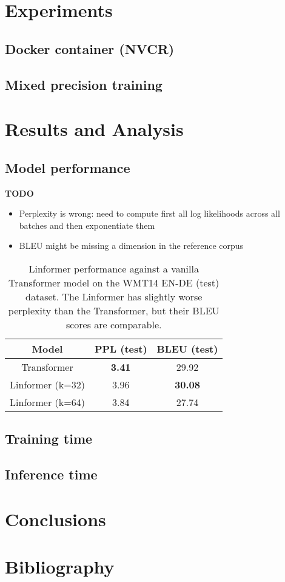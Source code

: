 \documentclass[titlepage]{article}
\begin{document}
\section{Experiments}
\subsection{Docker container (NVCR)}
\subsection{Mixed precision training}

\section{Results and Analysis}

\subsection{Model performance}

\textbf{TODO}
\begin{itemize}
  \item Perplexity is wrong: need to compute first all log likelihoods across
    all batches and then exponentiate them
  \item BLEU might be missing a dimension in the reference corpus
\end{itemize}

\begin{table}
  \begin{center}
    \begin{tabular}{c c c}
      \toprule
      Model                 & PPL (test) & BLEU (test)  \\
      \midrule
      Transformer       & \textbf{3.41} & 29.92 \\
      Linformer (k=32)  & 3.96          & \textbf{30.08}           \\
      Linformer (k=64)  & 3.84          & 27.74           \\
      \bottomrule
    \end{tabular}
  \end{center}
  \caption{Linformer performance against a vanilla Transformer model on the
  WMT14 EN-DE (test) dataset. The Linformer has slightly worse perplexity than
the Transformer, but their BLEU scores are comparable.}
  \label{tab:performance}
\end{table}
\subsection{Training time}\label{sec:training}

\subsection{Inference time}\label{sec:inference}

\section{Conclusions}

\section*{Bibliography}
\nocite{*}
\printbibliography[heading=bibintoc]
\end{document}
